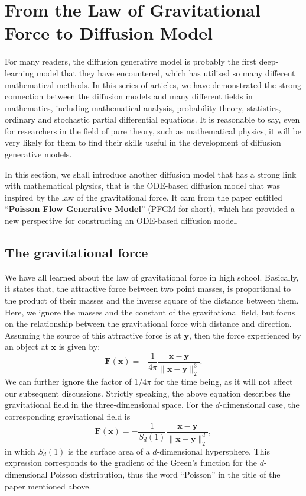 \section{From the Law of Gravitational Force to Diffusion Model}

For many readers, the diffusion generative model is probably the first deep-learning model that they have encountered, which has utilised so many different mathematical methods. In this series of articles, we have demonstrated the strong connection between the diffusion models and many different fields in mathematics, including mathematical analysis, probability theory, statistics, ordinary and stochastic partial differential equations. It is reasonable to say, even for researchers in the field of pure theory, such as mathematical physics, it will be very likely for them to find their skills useful in the development of diffusion generative models. 

In this section, we shall introduce another diffusion model that has a strong link with mathematical physics, that is the ODE-based diffusion model that was inspired by the law of the gravitational force. It cam from the paper entitled ``\textbf{Poisson Flow Generative Model}''\cite{xu2022poisson} (PFGM for short), which has provided a new perspective for constructing an ODE-based diffusion model.

\subsection{The gravitational force}

We have all learned about the law of gravitational force in high school. Basically, it states that, the attractive force between two point masses, is proportional to the product of their masses and the inverse square of the distance between them. Here, we ignore the masses and the constant of the gravitational field, but focus on the relationship between the gravitational force with distance and direction. Assuming the source of this attractive force is at $\bm{y}$, then the force experienced by an object at $\bm{x}$ is given by:
\begin{equation}
    \label{eq:13.1}
    \bm{F}(\bm{x})=-\frac{1}{4\pi}\frac{\bm{x}-\bm{y}}{\|\bm{x}-\bm{y}\|_2^3}.
\end{equation}
We can further ignore the factor of $1/4\pi$ for the time being, as it will not affect our subsequent discussions. Strictly speaking, the above equation describes the gravitational field in the three-dimensional space. For the $d$-dimensional case, the corresponding gravitational field is 
\begin{equation}
    \label{eq:13.2}
    \bm{F}(\bm{x})=-\frac{1}{S_d (1)}\frac{\bm{x}-\bm{y}}{\|\bm{x}-\bm{y}\|_2^d},
\end{equation}
in which $S_d(1)$ is the surface area of a $d$-dimensional hypersphere. This expression corresponds to the gradient of the Green's function for the $d$-dimensional Poisson distribution, thus the word ``Poisson'' in the title of the paper mentioned above. 

